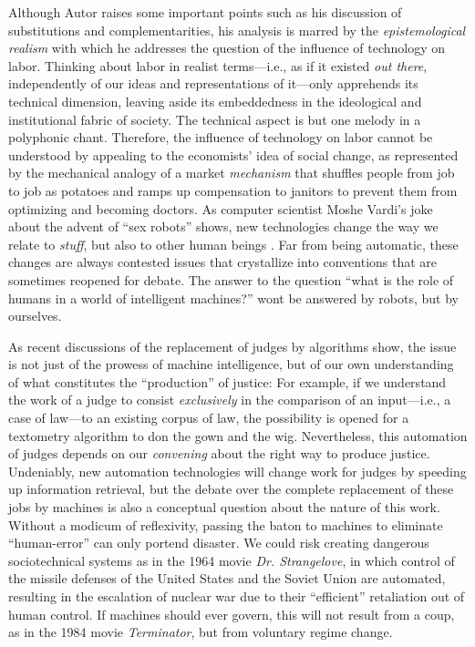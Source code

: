 \documentclass[version=last,draft=false,paper=A4,portrait,twoside=true,twocolumn=false,headinclude=false,footinclude=false,fontsize=12,BCOR=20mm,DIV=calc,pagesize=auto,titlepage=firstiscover,mpinclude=false,open=right,chapterprefix=true,numbers=autoendperiod,headsepline=false,headings=twolinechapter,parskip=false]{scrbook}
\begin{document}
Although Autor raises some important points such as his discussion of
substitutions and complementarities, his analysis is marred by the
\emph{epistemological realism} with which he addresses the question of the
influence of technology on labor. Thinking about labor in realist
terms---i.e., as if it existed \emph{out there}, independently of our ideas and
representations of it---only apprehends its technical dimension, leaving
aside its embeddedness in the ideological and institutional fabric of
society. The technical aspect is but one melody in a polyphonic chant.
Therefore, the influence of technology on labor cannot be understood by
appealing to the economists' idea of social change, as represented by the
mechanical analogy of a market \emph{mechanism} that shuffles people from job to
job as potatoes and ramps up compensation to janitors to prevent them from
optimizing and becoming doctors. As computer scientist Moshe Vardi's joke
about the advent of ``sex robots'' shows, new technologies change the way
we relate to \emph{stuff}, but also to other human beings \autocite{yuhas2016}. Far
from being automatic, these changes are always contested issues that
crystallize into conventions that are sometimes reopened for debate. The
answer to the question ``what is the role of humans in a world of
intelligent machines?'' wont be answered by robots, but by ourselves.

 As recent discussions of the replacement of judges by algorithms show, the
issue is not just of the prowess of machine intelligence, but of our own
understanding of what constitutes the ``production'' of justice: For
example, if we understand the work of a judge to consist \emph{exclusively} in the
comparison of an input---i.e., a case of law---to an existing corpus of
law, the possibility is opened for a textometry algorithm to don the gown
and the wig. Nevertheless, this automation of judges depends on our
\emph{convening} about the right way to produce justice. Undeniably, new
automation technologies will change work for judges by speeding up
information retrieval, but the debate over the complete replacement of
these jobs by machines is also a conceptual question about the nature of
this work. Without a modicum of reflexivity, passing the baton to machines
to eliminate ``human-error'' can only portend disaster. We could risk
creating dangerous sociotechnical systems as in the 1964 movie \emph{Dr.
Strangelove}, in which control of the missile defenses of the United States
and the Soviet Union are automated, resulting in the escalation of nuclear
war due to their ``efficient'' retaliation out of human control. If
machines should ever govern, this will not result from a coup, as in the
1984 movie \emph{Terminator}, but from voluntary regime change.
\end{document}
